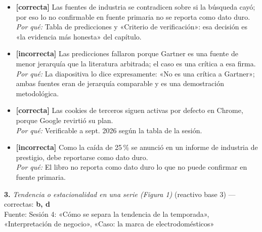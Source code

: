 \documentclass[10pt,letterpaper]{article}
\begin{document}
\begin{itemize}[leftmargin=1.2em,itemsep=0pt,topsep=1pt,parsep=0pt]
\item[\textbf{a)}] {\footnotesize \textbf{[correcta]} Las fuentes de industria se contradicen sobre si la búsqueda cayó; por eso lo no confirmable en fuente primaria no se reporta como dato duro.\\ \textit{Por qué:} Tabla de predicciones y «Criterio de verificación»: esa decisión es «la evidencia más honesta» del capítulo.}
\item[\textbf{b)}] {\footnotesize \textbf{[incorrecta]} Las predicciones fallaron porque Gartner es una fuente de menor jerarquía que la literatura arbitrada; el caso es una crítica a esa firma.\\ \textit{Por qué:} La diapositiva lo dice expresamente: «No es una crítica a Gartner»; ambas fuentes eran de jerarquía comparable y es una demostración metodológica.}
\item[\textbf{c)}] {\footnotesize \textbf{[correcta]} Las cookies de terceros siguen activas por defecto en Chrome, porque Google revirtió su plan.\\ \textit{Por qué:} Verificable a sept. 2026 según la tabla de la sesión.}
\item[\textbf{d)}] {\footnotesize \textbf{[incorrecta]} Como la caída de 25\,\% se anunció en un informe de industria de prestigio, debe reportarse como dato duro.\\ \textit{Por qué:} El libro no reporta como dato duro lo que no puede confirmar en fuente primaria.}
\end{itemize}
\vspace{3pt}\noindent\textbf{3.} \textit{Tendencia o estacionalidad en una serie (Figura 1)} (reactivo base 3) — correctas: \textbf{b, d}\\[-1pt]
{\scriptsize Fuente: Sesión 4: «Cómo se separa la tendencia de la temporada», «Interpretación de negocio», «Caso: la marca de electrodomésticos»}
\end{document}
